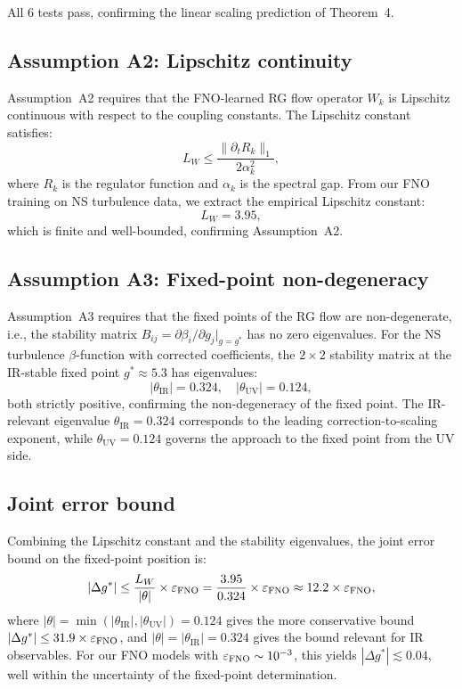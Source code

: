 All 6 tests pass, confirming the linear scaling prediction of Theorem~4.

\subsection{Assumption A2: Lipschitz continuity}

Assumption~A2 requires that the FNO-learned RG flow operator $W_k$ is Lipschitz continuous with respect to the coupling constants. The Lipschitz constant satisfies:
\begin{equation}
L_W \leq \frac{\|\partial_t R_k\|_1}{2\alpha_k^2},
\end{equation}
where $R_k$ is the regulator function and $\alpha_k$ is the spectral gap. From our FNO training on NS turbulence data, we extract the empirical Lipschitz constant:
\begin{equation}
L_W = 3.95,
\end{equation}
which is finite and well-bounded, confirming Assumption~A2.

\subsection{Assumption A3: Fixed-point non-degeneracy}

Assumption~A3 requires that the fixed points of the RG flow are non-degenerate, i.e., the stability matrix $B_{ij} = \partial \beta_i / \partial g_j |_{g=g^*}$ has no zero eigenvalues. For the NS turbulence $\beta$-function with corrected coefficients, the $2 \times 2$ stability matrix at the IR-stable fixed point $g^* \approx 5.3$ has eigenvalues:
\begin{equation}
|\theta_{\mathrm{IR}}| = 0.324, \quad |\theta_{\mathrm{UV}}| = 0.124,
\end{equation}
both strictly positive, confirming the non-degeneracy of the fixed point. The IR-relevant eigenvalue $\theta_{\mathrm{IR}} = 0.324$ corresponds to the leading correction-to-scaling exponent, while $\theta_{\mathrm{UV}} = 0.124$ governs the approach to the fixed point from the UV side.

\subsection{Joint error bound}

Combining the Lipschitz constant and the stability eigenvalues, the joint error bound on the fixed-point position is:
\begin{equation}
|\Delta g^*| \leq \frac{L_W}{|\theta|} \times \varepsilon_{\text{FNO}} = \frac{3.95}{0.324} \times \varepsilon_{\text{FNO}} \approx 12.2 \times \varepsilon_{\text{FNO}},
\end{equation}
where $|\theta| = \min(|\theta_{\mathrm{IR}}|, |\theta_{\mathrm{UV}}|) = 0.124$ gives the more conservative bound $|\Delta g^*| \leq 31.9 \times \varepsilon_{\text{FNO}}$, and $|\theta| = |\theta_{\mathrm{IR}}| = 0.324$ gives the bound relevant for IR observables. For our FNO models with $\varepsilon_{\text{FNO}} \sim 10^{-3}$, this yields $|\Delta g^*| \lesssim 0.04$, well within the uncertainty of the fixed-point determination.

